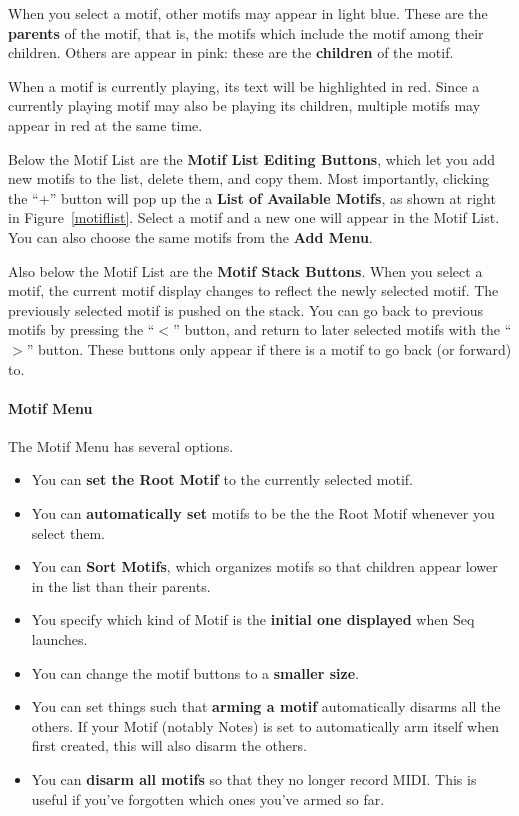 \documentclass[twoside,10pt]{article}
\begin{document}
When you select a motif, other motifs may appear in light blue.  These are the {\bf parents} of the motif, that is, the motifs which include the motif among their children.  Others are appear in pink: these are the {\bf children} of the motif.

When a motif is currently playing, its text will be highlighted in red.  Since a currently playing motif may also be playing its children, multiple motifs may appear in red at the same time.

Below the Motif List are the {\bf Motif List Editing Buttons}, which let you add new motifs to the list, delete them, and copy them.   Most importantly, clicking the ``\(+\)'' button will pop up the a {\bf List of Available Motifs}, as shown at right in Figure~\ref{motiflist}.  Select a motif and a new one will appear in the Motif List.   You can also choose the same motifs from the {\bf Add Menu}.

Also below the Motif List are the {\bf Motif Stack Buttons}.  When you select a motif, the current motif display changes to reflect the newly selected motif.  The previously selected motif is pushed on the stack.  You can go back to previous motifs by pressing the ``\(<\)'' button, and return to later selected motifs with the ``\(>\)'' button.  These buttons only appear if there is a motif to go back (or forward) to.

\paragraph{Motif Menu}

The Motif Menu has several options.  

	\begin{itemize}
	\item You can {\bf set the Root Motif} to the currently selected motif.  
	\item You can {\bf automatically set} motifs to be the the Root Motif whenever you select them.  
	\item You can {\bf Sort Motifs}, which organizes motifs so that children appear lower in the list than their parents.  
	\item You specify which kind of Motif is the {\bf initial one displayed} when Seq launches.
	\item You can change the motif buttons to a {\bf smaller size}.
	\item You can set things such that {\bf arming a motif} automatically disarms all the others.  If your Motif (notably Notes) is set to automatically arm itself when first created, this will also disarm the others.
	\item You can {\bf disarm all motifs} so that they no longer record MIDI.  This is useful if you've forgotten which ones you've armed so far.
	\end{itemize}
\end{document}
